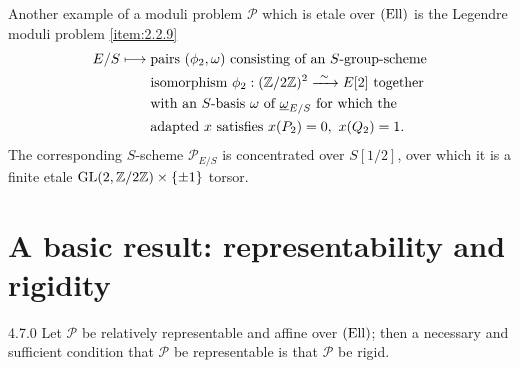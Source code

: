 \kmeqitem\label{item:4.6.2}
Another example of a moduli problem $\mathcal{P}$ which is etale over $(\mathrm{Ell})$ is the Legendre moduli problem \ref{item:2.2.9}
\[
\begin{aligned}
E/S \longmapsto {} & \text{pairs } (\phi_2, \omega) \text{ consisting of an } S\text{-group-scheme} \\
& \text{isomorphism } \phi_2 : (\mathbb{Z}/2\mathbb{Z})^2 \xrightarrow{\ \sim\ } E[2] \text{ together} \\
& \text{with an } S\text{-basis } \omega \text{ of } \underline{\omega}_{E/S} \text{ for which the} \\
& \text{adapted } x \text{ satisfies } x(P_2) = 0,\ x(Q_2) = 1.
\end{aligned}
\]
The corresponding $S$-scheme $\mathcal{P}_{E/S}$ is concentrated over $S[1/2]$, over which it is a finite etale $\operatorname{GL}(2,\mathbb{Z}/2\mathbb{Z}) \times \{\pm 1\}$ torsor.

\section{A basic result: representability and rigidity}
\label{sec:4.7}

\begin{pscholie}{4.7.0}\label{thm:4.7.0}
Let $\mathcal{P}$ be relatively representable and affine over $(\mathrm{Ell})$; then a necessary and sufficient condition that $\mathcal{P}$ be representable is that $\mathcal{P}$ be rigid.
\end{pscholie}

